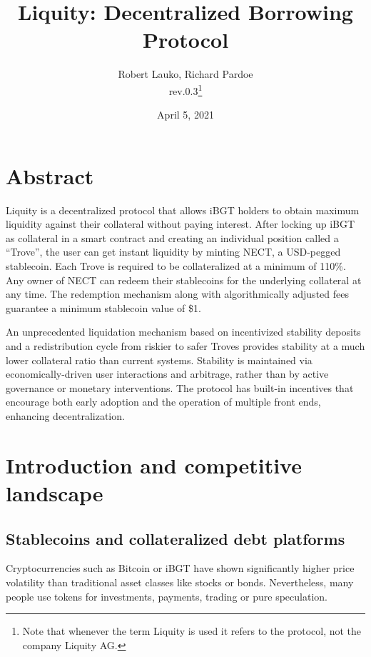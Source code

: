\documentclass{article}
\begin{document}
\title{\textbf{Liquity: Decentralized Borrowing Protocol}}
\author{Robert Lauko, Richard Pardoe \\ rev.0.3\footnote{Note that whenever the term Liquity is used it refers to the protocol, not the company Liquity AG.}}
\date{April 5, 2021}

\maketitle

\section*{Abstract}
Liquity is a decentralized protocol that allows iBGT holders to obtain maximum liquidity against their collateral without paying interest. After locking up iBGT as collateral in a smart contract and creating an individual position called a “Trove”, the user can get instant liquidity by minting NECT, a USD-pegged stablecoin. Each Trove is required to be collateralized at a minimum of 110\%. Any owner of NECT can redeem their stablecoins for the underlying collateral at any time. The redemption mechanism along with algorithmically adjusted fees guarantee a minimum stablecoin value of \$1. 

An unprecedented liquidation mechanism based on incentivized stability deposits and a redistribution cycle from riskier to safer Troves provides stability at a much lower collateral ratio than current systems. Stability is maintained via economically-driven user interactions and arbitrage, rather than by active governance or monetary interventions. 
The protocol has built-in incentives that encourage both early adoption and the operation of multiple front ends, enhancing decentralization.

\newpage

\tableofcontents

\section{Introduction and competitive landscape}

\subsection{Stablecoins and collateralized debt platforms}
Cryptocurrencies such as Bitcoin or iBGT have shown significantly higher price volatility than traditional asset classes like stocks or bonds. Nevertheless, many people use tokens for investments, payments, trading or pure speculation.
\end{document}
